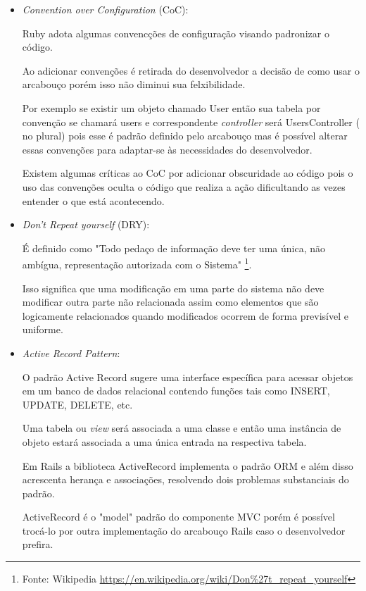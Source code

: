 \begin{itemize}
\item {\emph{Convention over Configuration} (CoC):}
    \par  Ruby adota algumas convencções de configuração visando padronizar o código.
    \par Ao adicionar convenções é retirada do desenvolvedor a decisão de como usar o arcabouço porém isso não diminui sua felxibilidade. 
    \par Por exemplo se existir um objeto chamado User então sua tabela por convenção se chamará users e correspondente \emph{controller} será UsersController ( no plural) pois esse é padrão definido pelo arcabouço mas é possível alterar essas convenções para adaptar-se às necessidades do desenvolvedor.
       \par Existem algumas críticas ao CoC por adicionar obscuridade ao código pois o uso das convenções oculta o código que realiza a ação dificultando as vezes entender o que está acontecendo.

\item {\emph{Don't Repeat yourself} (DRY):}
    \par É definido como "Todo pedaço de informação deve ter uma única, não ambígua, representação autorizada com o Sistema" \footnote{Fonte: Wikipedia \url{https://en.wikipedia.org/wiki/Don\%27t_repeat_yourself}}.
    \par Isso significa que uma modificação em uma parte do sistema não deve modificar outra parte não relacionada assim como elementos que são logicamente relacionados quando modificados ocorrem de forma previsível e uniforme.

\item { \emph{Active Record Pattern}:}
    \par O padrão Active Record sugere uma interface específica para acessar objetos em um banco de dados relacional contendo funções tais como INSERT, UPDATE, DELETE, etc.
    \par Uma tabela ou \emph{view} será associada a uma classe e então uma instância de objeto estará associada a uma única entrada na respectiva tabela.
    \par Em Rails a biblioteca ActiveRecord implementa o padrão ORM e além disso acrescenta herança e associações, resolvendo dois problemas substanciais do padrão.
    \par ActiveRecord é o "model" padrão do componente MVC porém é possível trocá-lo por outra implementação do arcabouço Rails caso o desenvolvedor prefira.
\end{itemize}

